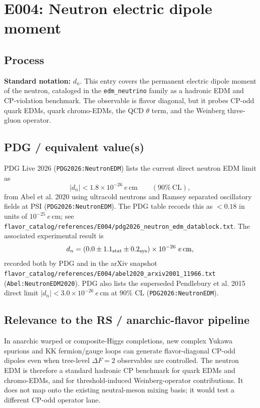 
\section{E004: Neutron electric dipole moment}

\subsection*{Process}
\textbf{Standard notation:} \(d_n\).  This entry covers the permanent electric
dipole moment of the neutron, cataloged in the \texttt{edm\_neutrino} family
as a hadronic EDM and CP-violation benchmark.  The observable is flavor
diagonal, but it probes CP-odd quark EDMs, quark chromo-EDMs, the QCD
\(\theta\) term, and the Weinberg three-gluon operator.

\subsection*{PDG / equivalent value(s)}
PDG Live 2026 (\texttt{PDG2026:NeutronEDM}) lists the current direct neutron
EDM limit as
\[
  |d_n| < 1.8\times 10^{-26}\ e\,\mathrm{cm}
  \qquad (90\%~\mathrm{CL}),
\]
from Abel et al. 2020 using ultracold neutrons and Ramsey separated oscillatory
fields at PSI (\texttt{PDG2026:NeutronEDM}).  The PDG table records this as
\(<0.18\) in units of \(10^{-25}\ e\,\mathrm{cm}\); see
\texttt{flavor\_catalog/references/E004/pdg2026\_neutron\_edm\_datablock.txt}.
The associated experimental result is
\[
  d_n = (0.0\pm1.1_{\rm stat}\pm0.2_{\rm sys})\times10^{-26}\ e\,\mathrm{cm},
\]
recorded both by PDG and in the arXiv snapshot
\texttt{flavor\_catalog/references/E004/abel2020\_arxiv2001\_11966.txt}
(\texttt{Abel:NeutronEDM2020}).  PDG also lists the superseded Pendlebury
et al. 2015 direct limit \(|d_n|<3.0\times10^{-26}\ e\,\mathrm{cm}\) at
\(90\%\) CL (\texttt{PDG2026:NeutronEDM}).

\subsection*{Relevance to the RS / anarchic-flavor pipeline}
In anarchic warped or composite-Higgs completions, new complex Yukawa spurions
and KK fermion/gauge loops can generate flavor-diagonal CP-odd dipoles even
when tree-level \(\Delta F=2\) observables are controlled.  The neutron EDM is
therefore a standard hadronic CP benchmark for quark EDMs and chromo-EDMs, and
for threshold-induced Weinberg-operator contributions.  It does not map onto
the existing neutral-meson mixing basis; it would test a different CP-odd
operator lane.

